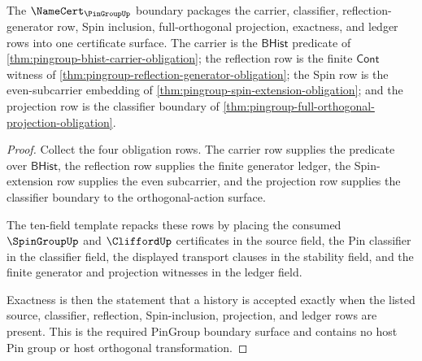 \begin{theorem}
\label{thm:pingroup-namecert-boundary-surface}
The $\NameCert_{\PinGroupUp}$ boundary packages the carrier, classifier,
reflection-generator row, Spin inclusion, full-orthogonal projection,
exactness, and ledger rows into one certificate surface. The carrier is the
$\mathsf{BHist}$ predicate of
\autoref{thm:pingroup-bhist-carrier-obligation}; the reflection row is the
finite $\mathsf{Cont}$ witness of
\autoref{thm:pingroup-reflection-generator-obligation}; the Spin row is the
even-subcarrier embedding of
\autoref{thm:pingroup-spin-extension-obligation}; and the projection row is
the classifier boundary of
\autoref{thm:pingroup-full-orthogonal-projection-obligation}.
\end{theorem}
\begin{proof}
Collect the four obligation rows. The carrier row supplies the predicate over
$\mathsf{BHist}$, the reflection row supplies the finite generator ledger, the
Spin-extension row supplies the even subcarrier, and the projection row
supplies the classifier boundary to the orthogonal-action surface.

The ten-field template repacks these rows by placing the consumed
$\SpinGroupUp$ and $\CliffordUp$ certificates in the source field, the Pin
classifier in the classifier field, the displayed transport clauses in the
stability field, and the finite generator and projection witnesses in the
ledger field.

Exactness is then the statement that a history is accepted exactly when the
listed source, classifier, reflection, Spin-inclusion, projection, and ledger
rows are present. This is the required PinGroup boundary surface and contains
no host Pin group or host orthogonal transformation.
\end{proof}

